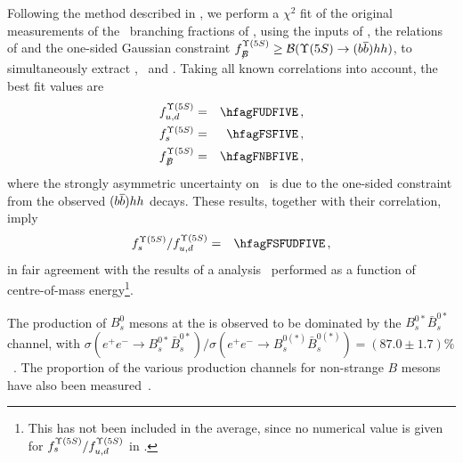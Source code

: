 Following the method described in , 
we perform a $\chi^2$ fit of the original 
measurements of the \Upsfive\ branching fractions of
,
using the inputs of ,
the relations of  and the
one-sided Gaussian constraint $\fnBfive \ge {\cal B}(\Upsfive \to (\b\bar{\b}) hh)$,
to simultaneously extract \fudfive, \fsfive\ and \fnBfive. Taking all known 
correlations into account, the best fit values are
\begin{eqnarray}
\fudfive &=& \hfagFUDFIVE \,, \labe{fudfive} \\
\fsfive  &=& \hfagFSFIVE  \,, \labe{fsfive}  \\
\fnBfive &=& \hfagFNBFIVE \,, \labe{fnBfive}
\end{eqnarray}
where the strongly asymmetric uncertainty on \fnBfive\ is due to the one-sided constraint
from the observed $(\b\bar{\b}) hh$ decays. These results, together with their correlation, 
imply
\begin{eqnarray}
\fsfive/\fudfive  &=& \hfagFSFUDFIVE  \,, \labe{fsfudfive} 
\end{eqnarray}
in fair agreement with the results of a \babar
analysis~\cite{Lees:2011ji} performed as a function 
of centre-of-mass energy\footnote{
  \label{foot:life_mix:Lees:2011ji}
  This has not been included in the average, since 
  no numerical value is given for $f^{\Upsilon(5S)}_{s}/f^{\Upsilon(5S)}_{u,d}$ in 
  .
}.

The production of $B^0_s$ mesons at the \Upsfive
is observed to be dominated by the $B_s^{0*}\bar{B}_s^{0*}$
channel, %
with $\sigma(e^+e^- \to B_s^{0*}\bar{B}_s^{0*})/%
\sigma(e^+e^- \to B_s^{0(*)}\bar{B}_s^{0(*)})
= (87.0\pm 1.7)\%$~\cite{Li:2011pg,Louvot:2008sc}.
The proportion of the various production channels 
for non-strange $B$ mesons have also been measured~\cite{Drutskoy:2010an}.

